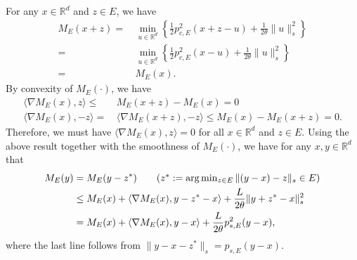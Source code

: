 \documentclass[11 pt]{article}
\begin{document}
\begin{enumerate}[(1)]
		For any $x \in \mathbb{R}^d$ and $z \in E$, we have
		\begin{align*}
			M_E(x+z) =\,& \min_{u \in \mathbb{R}^d} \left\{\frac{1}{2} p^2_{c,E}(x+z-u) + \frac{1}{2\theta} \| u \|^2_s \right\}\\
			=\,& \min_{u \in \mathbb{R}^d} \left\{\frac{1}{2} p^2_{c,E}(x-u) + \frac{1}{2\theta} \| u \|^2_s \right\} \\
			=\,& M_E(x).
		\end{align*}
		By convexity of $M_E(\cdot)$, we have
		\begin{align*}
			\langle\nabla M_E(x),z\rangle\leq\,& M_E(x+z)- M_E(x)=0  \\
			\langle \nabla M_E(x),-z\rangle=\,&\langle \nabla M_E(x+z),-z\rangle \leq M_E(x)-M_E(x+z)=0.
		\end{align*}
		Therefore, we must have $\langle \nabla M_E(x), z \rangle = 0$ for all $x \in \mathbb{R}^d$ and $z \in E$. Using the above result together with the smoothness of $M_E(\cdot)$, we have for any $x,y\in\mathbb{R}^d$ that
		\begin{align*}
			M_E(y) &= M_E(y-z^*) \tag{$z^* := \arg\min_{z \in E} \| (y - x) - z \|_s \in E$}\\
			&\leq M_E(x) + \langle \nabla M_E(x), y-z^*-x \rangle + \frac{L}{2\theta} \| y+z^*-x\|_s^2\\
			&= M_E(x) + \langle \nabla M_E(x), y-x \rangle + \frac{L}{2\theta} p^2_{s,E}(y-x),
		\end{align*}
		where the last line follows from $\|y-x-z^*\|_s=p_{s,E}(y-x)$.
		

\end{enumerate}
\end{document}
